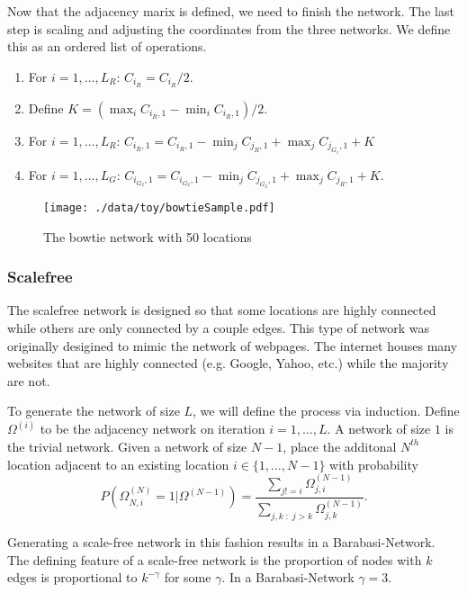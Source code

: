 \documentclass[11pt]{article}
\begin{document}
Now that the adjacency marix is defined, we need to finish the
network.  The last step is scaling and adjusting the coordinates from
the three networks.  We define this as an ordered list of operations.
\begin{enumerate}
  \item For $i=1,\ldots,L_R$: $C_{i_{R}} = C_{i_{R}}/2$.
  \item Define $K = (\max_i C_{i_{R},1} - \min_i C_{i_{R},1})/2$.
  \item For $i=1,\ldots,L_R$: $C_{i_{R},1} = C_{i_{R},1} -
  \min_j C_{j_{R},1} + \max_j C_{j_{G_1},1} + K$
  \item For $i=1,\ldots,L_G$:
  $C_{i_{G_2},1} = C_{i_{G_2},1} - \min_j C_{j_{G_2},1} + \max_j
  C_{j_{R},1} + K$.
\end{enumerate}


\begin{figure}[htb]
\centering
\texttt{[image: ./data/toy/bowtieSample.pdf]}
\caption{\label{fig:bowtie50}The bowtie network with 50 locations}
\end{figure}


\subsubsection{Scalefree}
\label{sec-3-1-6}

The scalefree network is designed so that some locations are highly
connected while others are only connected by a couple edges.  This
type of network was originally desigined to mimic the network of
webpages.  The internet houses many websites that are highly connected
(e.g. Google, Yahoo, etc.) while the majority are not.

To generate the network of size $L$, we will define the process via
induction.  Define $\Omega^{(i)}$ to be the adjacency network on
iteration $i = 1,\ldots,L$.  A network of size $1$ is the trivial
network.  Given a network of size $N-1$, place the additonal $N^{th}$
location adjacent to an existing location $i \in \lbrace
    1,\ldots,N-1\rbrace$ with probability
\begin{equation*}
  P(\Omega^{(N)}_{N,i} = 1 | \Omega^{(N-1)}) = 
  \frac{\sum_{j!=i} \Omega^{(N-1)}_{j,i}}{\sum_{j,k \;:\; j > k} \Omega^{(N-1)}_{j,k}}.
\end{equation*}

Generating a scale-free network in this fashion results in a
Barabasi-Network.  The defining feature of a scale-free network is the
proportion of nodes with $k$ edges is proportional to $k^{-\gamma}$
for some $\gamma$.  In a Barabasi-Network $\gamma = 3$.
\end{document}
